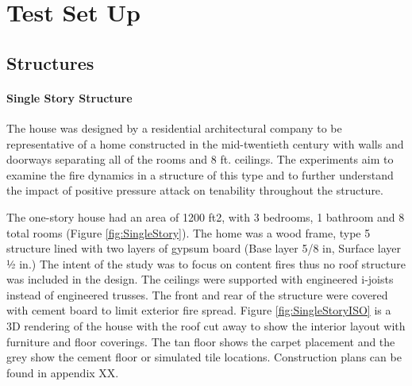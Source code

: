 \documentclass{article}
\begin{document}
\clearpage

\section{Test Set Up}

\subsection{Structures}

\paragraph{Single Story Structure} \mbox{}

The house was designed by a residential architectural company to be representative of a home constructed in the mid-twentieth century with walls and doorways separating all of the rooms and 8 ft. ceilings. The experiments aim to examine the fire dynamics in a structure of this type and to further understand the impact of positive pressure attack on tenability throughout the structure.

The one-story house had an area of 1200 ft2, with 3 bedrooms, 1 bathroom and 8 total rooms (Figure \ref{fig:SingleStory}). The home was a wood frame, type 5 structure lined with two layers of gypsum board (Base layer 5/8 in, Surface layer ½ in.) The intent of the study was to focus on content fires thus no roof structure was included in the design. The ceilings were supported with engineered i-joists instead of engineered trusses. The front and rear of the structure were covered with cement board to limit exterior fire spread. Figure \ref{fig:SingleStoryISO} is a 3D rendering of the house with the roof cut away to show the interior layout with furniture and floor coverings. The tan floor shows the carpet placement and the grey show the cement floor or simulated tile locations. Construction plans can be found in appendix XX.
\end{document}
